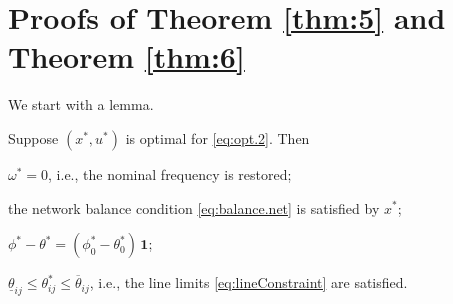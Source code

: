 \newpage
\appendices

\makeatletter
{}
\makeatother

\section{Proofs of Theorem \ref{thm:5} and Theorem \ref{thm:6}}

\renewcommand{\theequation}{A.\arabic{equation}}
\renewcommand{\thetheorem}{A.\arabic{theorem}}

We start with a lemma.
\begin{lemma}
	\label{lemma:6}
	Suppose $(x^*, u^*)$ is optimal for \eqref{eq:opt.2}.  Then
	\bee
	\item  $\omega^* = 0$, i.e., the nominal frequency is restored; 
	\item  the network balance condition \eqref{eq:balance.net} is satisfied by $x^*$;
	\item  $\phi^*-\theta^* = (\phi^*_0-\theta^*_0)\,\textbf{1}$;
	\item  $\underline{\theta}_{ij} \le \theta^*_{ij} \le \overline{\theta}_{ij}$, 
		i.e., the line limits \eqref{eq:lineConstraint} are satisfied.
	\eee
\end{lemma}
